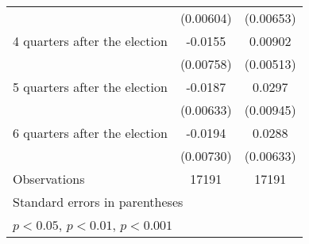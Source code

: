 \begin{table}[htbp]
\begin{tabular}{l*{2}{c}}
                    &   (0.00604)         &   (0.00653)         \\
[1em]
 4 quarters after the election&     -0.0155\sym{*}  &     0.00902         \\
                    &   (0.00758)         &   (0.00513)         \\
[1em]
 5 quarters after the election&     -0.0187\sym{**} &      0.0297\sym{**} \\
                    &   (0.00633)         &   (0.00945)         \\
[1em]
 6 quarters after the election&     -0.0194\sym{**} &      0.0288\sym{***}\\
                    &   (0.00730)         &   (0.00633)         \\
\hline
Observations        &       17191         &       17191         \\
\hline\hline
\multicolumn{3}{l}{\footnotesize Standard errors in parentheses}\\
\multicolumn{3}{l}{\footnotesize \sym{*} \(p<0.05\), \sym{**} \(p<0.01\), \sym{***} \(p<0.001\)}\\
\end{tabular}
\end{table}
